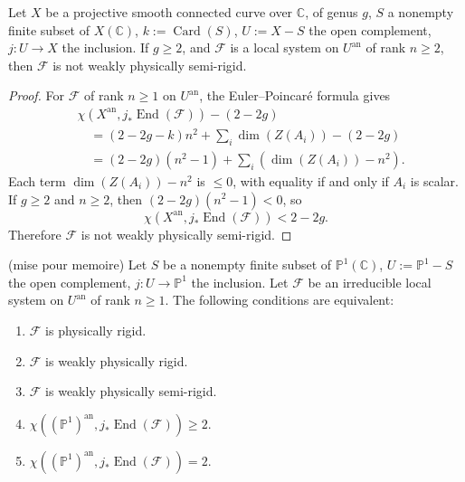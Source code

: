 \setcounter{theorem}{3}
\begin{corollary}
\label{cor:1.2.4}
Let \(X\) be a projective smooth connected curve over \(\mathbb{C}\), of genus
\(g\), \(S\) a nonempty finite subset of \(X(\mathbb{C})\), \(k:=\operatorname{Card}(S)\),
\(U:=X-S\) the open complement, \(j:U\to X\) the inclusion. If \(g\geq 2\), and
\(\mathcal{F}\) is a local system on \(U^{\mathrm{an}}\) of rank \(n\geq 2\),
then \(\mathcal{F}\) is not weakly physically semi-rigid.
\end{corollary}

\begin{proof}
For \(\mathcal{F}\) of rank \(n\geq 1\) on \(U^{\mathrm{an}}\), the
Euler--Poincaré formula gives
\begin{align*}
  &\chi(X^{\mathrm{an}},j_*\operatorname{End}(\mathcal{F}))-(2-2g)\\
  &\quad =
  (2-2g-k)n^2+\sum_i\dim(Z(A_i))-(2-2g)\\
  &\quad =
  (2-2g)(n^2-1)+\sum_i(\dim(Z(A_i))-n^2).
\end{align*}
Each term \(\dim(Z(A_i))-n^2\) is \(\leq 0\), with equality if and only if
\(A_i\) is scalar. If \(g\geq 2\) and \(n\geq 2\), then
\((2-2g)(n^2-1)<0\), so
\[
  \chi(X^{\mathrm{an}},j_*\operatorname{End}(\mathcal{F}))<2-2g.
\]
Therefore \(\mathcal{F}\) is not weakly physically semi-rigid.
\end{proof}

\setcounter{theorem}{4}
\begin{corollary}
\label{cor:1.2.5}
(mise pour memoire) Let \(S\) be a nonempty finite subset of
\(\mathbb{P}^1(\mathbb{C})\), \(U:=\mathbb{P}^1-S\) the open complement,
\(j:U\to\mathbb{P}^1\) the inclusion. Let \(\mathcal{F}\) be an irreducible
local system on \(U^{\mathrm{an}}\) of rank \(n\geq 1\). The following
conditions are equivalent:
\begin{enumerate}[label=(\arabic*)]
\item \(\mathcal{F}\) is physically rigid.
\item \(\mathcal{F}\) is weakly physically rigid.
\item \(\mathcal{F}\) is weakly physically semi-rigid.
\item
\(\chi((\mathbb{P}^1)^{\mathrm{an}},j_*\operatorname{End}(\mathcal{F}))\geq 2\).
\item
\(\chi((\mathbb{P}^1)^{\mathrm{an}},j_*\operatorname{End}(\mathcal{F}))=2\).
\end{enumerate}
\end{corollary}

